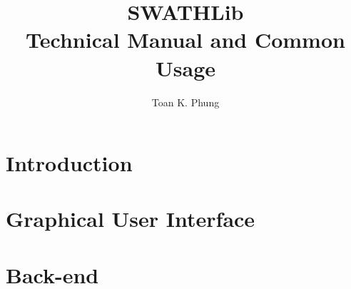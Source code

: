 \documentclass[10pt,a4paper]{memoir}
\title{%
SWATHLib \\
\large Technical Manual and Common Usage}
\author{Toan K. Phung}
\begin{document}
\frontmatter
\maketitle
\clearpage

\tableofcontents
\mainmatter
\chapter{Introduction}


\chapter{Graphical User Interface}


\chapter{Back-end}

\end{document}
